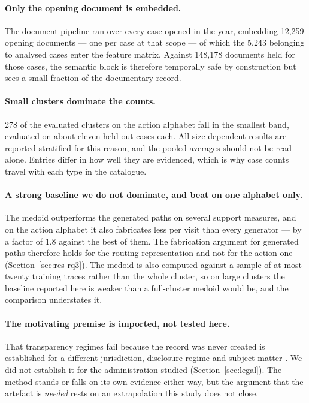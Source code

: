 \paragraph{Only the opening document is embedded.}
The document pipeline ran over every case opened in the year, embedding 12{,}259 opening
documents --- one per case at that scope --- of which the 5{,}243 belonging to analysed cases
enter the feature matrix. Against 148{,}178 documents held for those cases, the semantic block
is therefore temporally safe by construction but sees a small fraction of the documentary
record.

\paragraph{Small clusters dominate the counts.}
278 of the evaluated clusters on the action alphabet fall in the smallest band, evaluated on
about eleven held-out cases each. All size-dependent results are reported stratified for this
reason, and the pooled averages should not be read alone. Entries differ in how well they are
evidenced, which is why case counts travel with each type in the catalogue.

\paragraph{A strong baseline we do not dominate, and beat on one alphabet only.}
The medoid outperforms the generated paths on several support measures, and on the action
alphabet it also fabricates less per visit than every generator --- by a factor of 1.8 against
the best of them. The fabrication argument for generated paths therefore holds for the routing
representation and not for the action one (Section~\ref{sec:res-rq3}). The medoid is also
computed against a sample of at most twenty training traces rather than the whole cluster, so
on large clusters the baseline reported here is weaker than a full-cluster medoid would be, and
the comparison understates it.

\paragraph{The motivating premise is imported, not tested here.}
That transparency regimes fail because the record was never created is established for a
different jurisdiction, disclosure regime and subject matter \citep{brauneis2018algorithmic}.
We did not establish it for the administration studied (Section~\ref{sec:legal}). The method
stands or falls on its own evidence either way, but the argument that the artefact is
\emph{needed} rests on an extrapolation this study does not close.

